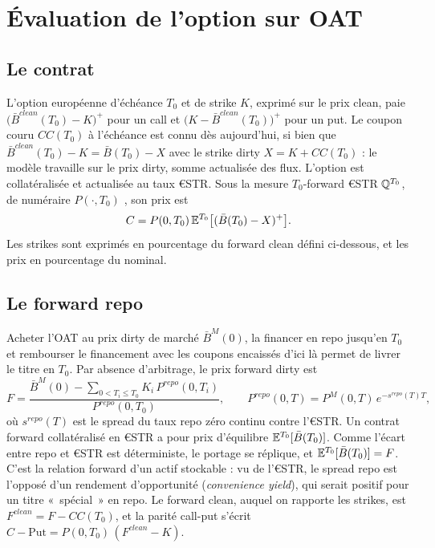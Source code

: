 \section{Évaluation de l'option sur OAT}
\label{sec:evaluation}

\subsection{Le contrat}

L'option européenne d'échéance $T_0$ et de strike $K$, exprimé sur le prix clean, paie
$\big(\bar B^{clean}(T_0) - K\big)^+$ pour un call et $\big(K - \bar B^{clean}(T_0)\big)^+$ pour un put. Le
coupon couru $CC(T_0)$ à l'échéance est connu dès aujourd'hui, si bien que
$\bar B^{clean}(T_0) - K = \bar B(T_0) - X$ avec le strike dirty $X = K + CC(T_0)$ : le modèle travaille sur le
prix dirty, somme actualisée des flux. L'option est collatéralisée et actualisée au taux €STR. Sous la mesure
$T_0$-forward €STR $\mathbb{Q}^{T_0}$, de numéraire $P(\cdot,T_0)$ \citep[CM3]{Hillairet2026}, son prix est
\begin{equation}
C = P(0,T_0)\,\mathbb{E}^{T_0}\big[(\bar B(T_0) - X)^+\big].
\label{eq:prix_call}
\end{equation}
Les strikes sont exprimés en pourcentage du forward clean défini ci-dessous, et les prix en pourcentage du nominal.

\subsection{Le forward repo}

Acheter l'OAT au prix dirty de marché $\bar B^M(0)$, la financer en repo jusqu'en $T_0$ et rembourser le
financement avec les coupons encaissés d'ici là permet de livrer le titre en $T_0$. Par absence d'arbitrage, le
prix forward dirty est
\begin{equation}
F = \frac{\bar B^M(0) - \sum_{0 < T_i \le T_0} K_i\,P^{repo}(0,T_i)}{P^{repo}(0,T_0)},\qquad
P^{repo}(0,T) = P^M(0,T)\,e^{-s^{repo}(T)T},
\label{eq:forward}
\end{equation}
où $s^{repo}(T)$ est le spread du taux repo zéro continu contre l'€STR. Un contrat forward collatéralisé en €STR
a pour prix d'équilibre $\mathbb{E}^{T_0}[\bar B(T_0)]$. Comme l'écart entre repo et €STR est déterministe, le portage se
réplique, et $\mathbb{E}^{T_0}[\bar B(T_0)] = F$. C'est la relation forward d'un actif stockable
\citep[cours~2, slides~16-18]{MPR2025} : vu de l'€STR, le spread repo est l'opposé d'un rendement d'opportunité
(\emph{convenience yield}), qui serait positif pour un titre «~spécial~» en repo. Le forward clean, auquel on
rapporte les strikes, est $F^{clean} = F - CC(T_0)$, et la parité call-put s'écrit
$C - \text{Put} = P(0,T_0)\,(F^{clean} - K)$.

